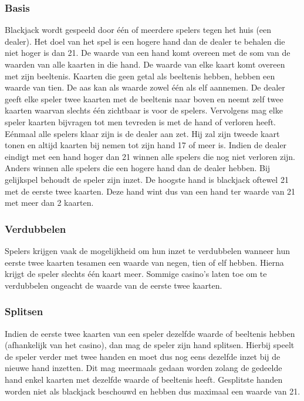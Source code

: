 \documentclass[conference]{IEEEtran}
\begin{document}
\subsubsection{Basis}
Blackjack wordt gespeeld door \'e\'en of meerdere spelers tegen het huis (een dealer). Het doel van het spel is een hogere hand dan de dealer te behalen die niet hoger is dan 21. De waarde van een hand komt overeen met de som van de waarden van alle kaarten in die hand. De waarde van elke kaart komt overeen met zijn beeltenis. Kaarten die geen getal als beeltenis hebben, hebben een waarde van tien. De aas kan als waarde zowel \'e\'en als elf aannemen. De dealer geeft elke speler twee kaarten met de beeltenis naar boven en neemt zelf twee kaarten waarvan slechts \'e\'en zichtbaar is voor de spelers. Vervolgens mag elke speler kaarten bijvragen tot men tevreden is met de hand of verloren heeft. E\'enmaal alle spelers klaar zijn is de dealer aan zet. Hij zal zijn tweede kaart tonen en altijd kaarten bij nemen tot zijn hand 17 of meer is. Indien de dealer eindigt met een hand hoger dan 21 winnen alle spelers die nog niet verloren zijn. Anders winnen alle spelers die een hogere hand dan de dealer hebben. Bij gelijkspel behoudt de speler zijn inzet. De hoogste hand is blackjack oftewel 21 met de eerste twee kaarten. Deze hand wint dus van een hand ter waarde van 21 met meer dan 2 kaarten.

\subsubsection{Verdubbelen}
Spelers krijgen vaak de mogelijkheid om hun inzet te verdubbelen wanneer hun eerste twee kaarten tesamen een waarde van negen, tien of elf hebben. Hierna krijgt de speler slechts één kaart meer. Sommige casino's laten toe om te verdubbelen ongeacht de waarde van de eerste twee kaarten.

\subsubsection{Splitsen}
Indien de eerste twee kaarten van een speler dezelfde waarde of beeltenis hebben (afhankelijk van het casino), dan mag de speler zijn hand splitsen. Hierbij speelt de speler verder met twee handen en moet dus nog eens dezelfde inzet bij de nieuwe hand inzetten. Dit mag meermaals gedaan worden zolang de gedeelde hand enkel kaarten met dezelfde waarde of beeltenis heeft. Gesplitste handen worden niet als blackjack beschouwd en hebben dus maximaal een waarde van 21.
\end{document}
